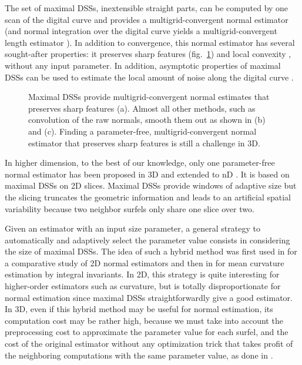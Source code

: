 The set of maximal DSSs, \ie inextensible straight parts, can be computed by one scan of the
digital curve \cite{Feschet1999,Feschet2005} and provides a multigrid-convergent
normal estimator \cite{Lachaud2007} (and normal integration over the digital curve yields
a multigrid-convergent length estimator \cite{Coeurjolly2004}). In addition to
convergence, this normal estimator has several sought-after properties:
it preserves sharp features (fig.~\ref{fig:corner}) and local convexity \cite{Roussillon2011},
without any input parameter. 
In addition, asymptotic properties of maximal DSSs can be used to estimate the local amount
of noise along the digital curve \cite{Kerautret2012}.  
\begin{figure}[htbp]
  \centering
  \caption{Maximal DSSs provide multigrid-convergent normal estimates that preserves sharp features (a). 
    Almost all other methods, such as convolution of the raw normals, smooth them out as shown in (b) and (c).
    Finding a parameter-free, multigrid-convergent normal estimator that preserves sharp features is still a
    challenge in 3D.}
  \label{fig:corner}
\end{figure}

In higher dimension, to the best of our knowledge, only one parameter-free normal estimator
has been proposed in 3D \cite{Lenoir1996,Tellier1999} and extended to nD \cite{Lachaud2003}.
It is based on maximal DSSs on 2D slices. Maximal DSSs provide windows of adaptive size
but the slicing truncates the geometric information and leads to
an artificial spatial variability because two neighbor surfels only
share one slice over two. 

Given an estimator with an input size parameter, a general strategy to automatically and adaptively select
the parameter value consists in considering the size of maximal DSSs. 
The idea of such a hybrid method was first used in \cite{Devieilleville2009}
for a comparative study of 2D normal estimators and then in \cite{Coeurjolly2014IIfree}
for mean curvature estimation by integral invariants.
In 2D, this strategy is quite interesting for higher-order estimators such as curvature,
but is totally disproportionate for normal estimation since maximal DSSs straightforwardly give a good estimator. 
In 3D, even if this hybrid method may be useful for normal estimation, its computation cost may be rather high,
because we must take into account the preprocessing cost to approximate the parameter value for each surfel,
and the cost of the original estimator without any optimization trick that takes profit of the neighboring
computations with the same parameter value, as done in \cite{Lachaud2017}. 

